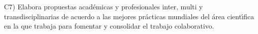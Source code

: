 C7) Elabora propuestas acad\'{e}micas y profesionales inter, multi y
transdisciplinarias de acuerdo a las mejores pr\'{a}cticas mundiales del
\'{a}rea cient\'{\i}fica en la que trabaja para fomentar y consolidar el
trabajo colaborativo.
